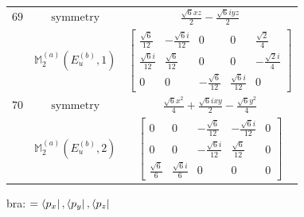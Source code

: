 \documentclass[fleqn,8pt,landscape]{jsarticle}
\begin{document}
\begin{longtable}{ccc}
$ 69 $ & $ \text{symmetry} $ & $ \frac{\sqrt{6} x z}{2} - \frac{\sqrt{6} i y z}{2} $ \\
$  $ & $ \mathbb{M}_{2}^{(a)}(E_{u}^{(b)},1) $ & $ \begin{bmatrix} \frac{\sqrt{6}}{12} & - \frac{\sqrt{6} i}{12} & 0 & 0 & \frac{\sqrt{2}}{4} \\ \frac{\sqrt{6} i}{12} & \frac{\sqrt{6}}{12} & 0 & 0 & - \frac{\sqrt{2} i}{4} \\ 0 & 0 & - \frac{\sqrt{6}}{12} & \frac{\sqrt{6} i}{12} & 0 \end{bmatrix} $ \\ \hline
$ 70 $ & $ \text{symmetry} $ & $ \frac{\sqrt{6} x^{2}}{4} + \frac{\sqrt{6} i x y}{2} - \frac{\sqrt{6} y^{2}}{4} $ \\
$  $ & $ \mathbb{M}_{2}^{(a)}(E_{u}^{(b)},2) $ & $ \begin{bmatrix} 0 & 0 & - \frac{\sqrt{6}}{12} & - \frac{\sqrt{6} i}{12} & 0 \\ 0 & 0 & - \frac{\sqrt{6} i}{12} & \frac{\sqrt{6}}{12} & 0 \\ \frac{\sqrt{6}}{6} & \frac{\sqrt{6} i}{6} & 0 & 0 & 0 \end{bmatrix} $ \\ \hline
\end{longtable}
bra: $=\bra{p_{x}}, \bra{p_{y}}, \bra{p_{z}}$
\end{document}
